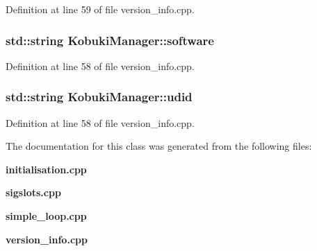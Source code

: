 \-Definition at line 59 of file version\-\_\-info.\-cpp.

\subsubsection[{software}]{\setlength{\rightskip}{0pt plus 5cm}std\-::string {\bf \-Kobuki\-Manager\-::software}\hspace{0.3cm}{\ttfamily  [private]}}\label{classKobukiManager_ada9d19dceec947a9722f64d6f4248a2d}


\-Definition at line 58 of file version\-\_\-info.\-cpp.

\subsubsection[{udid}]{\setlength{\rightskip}{0pt plus 5cm}std\-::string {\bf \-Kobuki\-Manager\-::udid}\hspace{0.3cm}{\ttfamily  [private]}}\label{classKobukiManager_a7f3b07bf7e4d7ce7d601e102ab2bd723}


\-Definition at line 58 of file version\-\_\-info.\-cpp.



\-The documentation for this class was generated from the following files\-:\begin{DoxyCompactItemize}
\item 
{\bf initialisation.\-cpp}\item 
{\bf sigslots.\-cpp}\item 
{\bf simple\-\_\-loop.\-cpp}\item 
{\bf version\-\_\-info.\-cpp}\end{DoxyCompactItemize}
